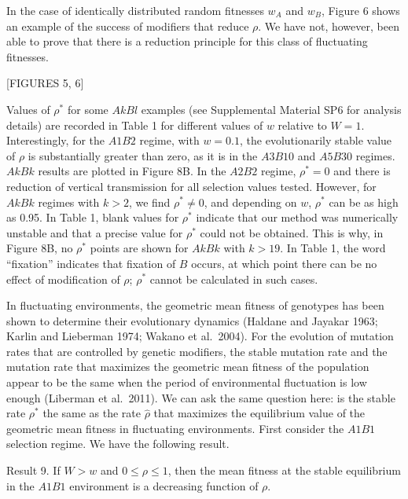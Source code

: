  In the case of identically distributed random fitnesses $w_A$ and $w_B$, Figure 6 shows  an example of the success of modifiers that reduce $\rho$. We have not, however, been able to prove that there is a reduction principle for this class of fluctuating fitnesses.
  
 
  \medskip
\centerline{[FIGURES 5, 6]}  

Values of $\rho^*$ for some $AkBl$ examples (see Supplemental Material SP6 for analysis details) are recorded in Table 1 for different values of $w$ relative to $W=1$. Interestingly, for the $A1B2$ regime, with $w=0.1$, the evolutionarily stable value of $\rho$ is substantially greater than zero, as it is in the $A3B10$ and $A5B30$ regimes.
$AkBk$ results are plotted in Figure 8B. In the $A2B2$ regime, $\rho^* =0$ and there is reduction of vertical transmission for all selection values tested. However, for $AkBk$ regimes with $k>2$, we find $\rho^*\ne 0$, and depending on $w$, $\rho^*$ can be as high as 0.95. In Table 1, blank values for $\rho^*$ indicate that our method was numerically unstable  and that a precise value for $\rho^*$ could not be obtained. This is why, in Figure 8B, no $\rho^*$ points are shown for $AkBk$ with $k>19$. In Table 1, the word ``fixation'' indicates that fixation of $B$ occurs, at which point there can be no effect of modification of $\rho$; $\rho^*$ cannot be calculated in such cases.
\bigskip\bigskip

\smallskip

In fluctuating environments, the geometric mean fitness of genotypes has been shown to determine their evolutionary dynamics (Haldane and Jayakar  1963; Karlin and Lieberman 1974; Wakano et al.\ 2004). For the evolution of mutation rates that are controlled by genetic modifiers, the stable mutation rate and the mutation rate that maximizes the geometric mean fitness of the population appear to be the same when the period of environmental fluctuation is low enough (Liberman et al.\ 2011). We can ask the same question here: is the stable rate $\rho^*$ the same as the rate $\hat\rho$ that maximizes the equilibrium value of the geometric mean fitness in fluctuating environments. First consider the $A1B1$ selection regime. We have the following result.

\proclaim Result 9. If $W>w$ and $0\le\rho\le 1$, then the mean fitness at the stable equilibrium in the $A1B1$ environment is a decreasing function of $\rho$.\par

